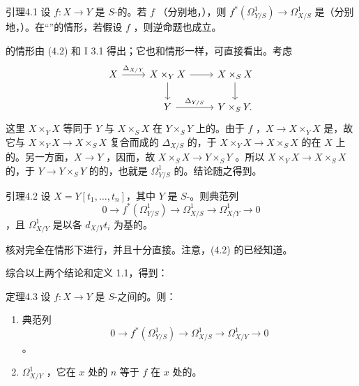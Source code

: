 \begin{SGAresult}{引理}{4.1}
设 $f:X\to Y$ 是 $S$-的。若 $f$ （分别地，），则 $f^*(\Omega^1_{Y/S})\to\Omega^1_{X/S}$ 是（分别地，）。在“”的情形，若假设 $f$ ，则逆命题也成立。
\end{SGAresult}

的情形由 (4.2) 和 I 3.1 得出；它也和情形一样，可直接看出。考虑
\[
\begin{tikzcd}
X \arrow[r,"\Delta_{X/Y}"] & X\times_Y X \arrow[r]\arrow[d]
  & X\times_S X \arrow[d]\\
 &Y \arrow[r,"\Delta_{Y/S}"] &Y\times_S Y.
\end{tikzcd}
\]
这里 $X\times_Y X$ 等同于 $Y$ 与 $X\times_S X$ 在 $Y\times_S Y$ 上的。由于 $f$ ，$X\to X\times_Y X$ 是，故它与 $X\times_Y X\to X\times_S X$ 复合而成的 $\Delta_{X/S}$ 的，于 $X\times_Y X\to X\times_S X$ 的在 $X$ 上的。另一方面，$X\to Y$ ，因而，故 $X\times_S X\to Y\times_S Y$ 。所以 $X\times_Y X\to X\times_S X$ 的，于 $Y\to Y\times_S Y$ 的的，也就是 $\Omega^1_{Y/S}$ 的。结论随之得到。

\begin{SGAresult}{引理}{4.2}
设 $X=Y[t_1,\ldots,t_n]$，其中 $Y$ 是 $S$-。则典范列
\[
0\longrightarrow f^*(\Omega^1_{Y/S})\longrightarrow\Omega^1_{X/S}
\longrightarrow\Omega^1_{X/Y}\longrightarrow0
\]
，且 $\Omega^1_{X/Y}$ 是以各 $d_{X/Y}t_i$ 为基的。
\end{SGAresult}
核对完全在情形下进行，并且十分直接。注意，(4.2) 的已经知道。

综合以上两个结论和定义 1.1，得到：
\begin{SGAresult}{定理}{4.3}
设 $f:X\to Y$ 是 $S$-之间的。则：
\begin{enumerate}
\item[(i)] 典范列
\[
0\longrightarrow f^*(\Omega^1_{Y/S})\longrightarrow\Omega^1_{X/S}
\longrightarrow\Omega^1_{X/Y}\longrightarrow0
\]
。
\item[(ii)] $\Omega^1_{X/Y}$ ，它在 $x$ 处的 $n$ 等于 $f$ 在 $x$ 处的。
\end{enumerate}
\end{SGAresult}

